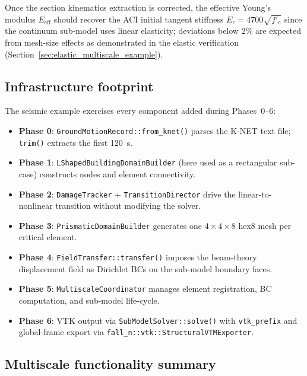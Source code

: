 Once the section kinematics extraction is corrected, the effective
Young's modulus $E_\text{eff}$ should recover the ACI initial tangent
stiffness $E_c = 4700\sqrt{f'_c}$ since the continuum sub-model uses
linear elasticity; deviations below $2\%$ are expected from mesh-size
effects as demonstrated in the elastic verification
(Section~\ref{sec:elastic_multiscale_example}).

\subsection{Infrastructure footprint}

The seismic example exercises every component added during Phases~0--6:

\begin{itemize}
  \item \textbf{Phase 0}: \texttt{GroundMotionRecord::from\_knet()} parses
        the K-NET text file; \texttt{trim()} extracts the first 120~s.
  \item \textbf{Phase 1}: \texttt{LShapedBuildingDomainBuilder} (here used
        as a rectangular sub-case) constructs nodes and element connectivity.
  \item \textbf{Phase 2}: \texttt{DamageTracker} + \texttt{TransitionDirector}
        drive the linear-to-nonlinear transition without modifying the solver.
  \item \textbf{Phase 3}: \texttt{PrismaticDomainBuilder} generates one
        $4\times4\times8$ hex8 mesh per critical element.
  \item \textbf{Phase 4}: \texttt{FieldTransfer::transfer()} imposes the
        beam-theory displacement field as Dirichlet BCs on the sub-model
        boundary faces.
  \item \textbf{Phase 5}: \texttt{MultiscaleCoordinator} manages element
        registration, BC computation, and sub-model life-cycle.
  \item \textbf{Phase 6}: VTK output via \texttt{SubModelSolver::solve()}
        with \texttt{vtk\_prefix} and global-frame export via
        \texttt{fall\_n::vtk::StructuralVTMExporter}.
\end{itemize}

\subsection{Multiscale functionality summary}

